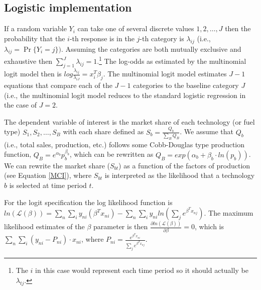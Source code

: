 \documentclass[10pt]{amsart}
\begin{document}
\subsection{Logistic implementation}
If a random variable $Y_{i}$ can take one of several discrete values $1, 2, \ldots, J$ then the probability that the $i$-th response is in the $j$-th category is $\lambda_{ij}$ (i.e., $\lambda_{ij} = \Pr\{Y_{i} = j\})$. 
Assuming the categories are both mutually exclusive and exhaustive then $\sum_{j=1}^J \lambda_{ij} = 1$.\footnote{The $i$ in this case would represent each time period so it should actually be $\lambda_{tj}$.} 
The log-odds as estimated by the multinomial logit model then is $log \frac{\lambda_{ij}}{\lambda_{iJ}} = x_{i}^T \beta_j$.
The multinomial logit model estimates $J - 1$ equations that compare each of the $J - 1$ categories to the baseline category $J$ (i.e., the multinomial logit model reduces to the standard logistic regression in the case of $J=2$. 

The dependent variable of interest is the market share of each technology (or fuel type) \textit{$S_1, S_2, \ldots, S_B$} with each share defined as $S_b = \frac{Q_b}{\sum_B Q_B}$.
We assume that $Q_b$ (i.e., total sales, production, etc.) follows some Cobb-Douglas type production function, $Q_B = e^{\alpha_b}p_{b}^{\beta_b}$, which can be rewritten as $Q_B = exp\left(\alpha_b + \beta_b \cdot ln(p_b)\right)$.
We can rewrite the market share ($S_{bt}$) as a function of the factors of production (see Equation \ref{MCI}), where $S_{bt}$ is interpreted as the likelihood that a technology $b$ is selected at time period $t$.  

For the logit specification the log likelihood function is $ln(\mathcal{L(\beta)})= \sum_{n} \sum_{i} y_{ni}\left(\beta^{T} x_{ni}\right) - \sum_{n} \sum_{i} y_{ni} ln\left(\sum_{j}e^{\beta^{T}x_{nj}}\right)$.
The maximum likelihood estimates of the $\beta$ parameter is then $\frac{\partial ln\left(\mathcal{L(\beta)}\right)}{\partial \beta} = 0$, which is $\sum_{n}\sum_{i} \left(y_{ni} - P_{ni}\right)\cdot x_{ni}$, where $P_{ni} = \frac{e^{\beta^{T}x_{ni}}}{\sum_{j} e^{\beta^{T}x_{nj}}}$.
\end{document}
